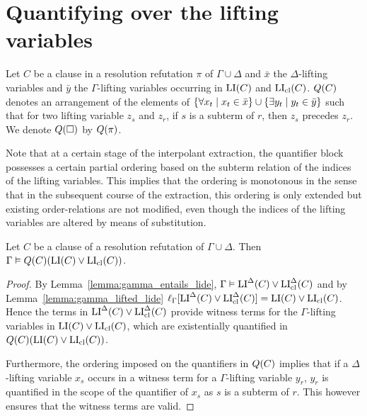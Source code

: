 \documentclass[,%
	draft=false,%
	numbers=noendperiod
	11pt,
	a4paper,
	oneside,%
	openany,
]{memoir}
\begin{document}
\section{Quantifying over the lifting variables}

\begin{defi}
	\label{old:def:arrow_quantifier_block}
	Let $C$ be a clause in a resolution refutation $\pi$ of $\Gamma\cup\Delta$
	and $\bar x$ the $\Delta$-lifting variables and $\bar y$ the $\Gamma$-lifting variables occurring in $\operatorname{LI}(C)$ and $\operatorname{LI}_{\operatorname{cl}}(C)$.
	$Q(C)$ denotes an arrangement of the elements of  $\{ \forall x_t \mid\nolinebreak x_t \in \bar x\} \cup \{ \exists y_t \mid y_t \in \bar y\}$ such that for two lifting variable $z_s$ and $z_r$, if $s$ is a subterm of $r$, then $z_s$ precedes $z_r$.
	We denote $Q(\square)$ by $Q(\pi)$.
\end{defi}

Note that at a certain stage of the interpolant extraction, the quantifier block possesses a certain partial ordering based on the subterm relation of the indices of the lifting variables.
This implies that the ordering is monotonous in the sense that in the subsequent course of the extraction, this ordering is only extended but existing order-relations are not modified, even though the indices of the lifting variables are altered by means of substitution.


\begin{lemma}
	\label{old:lemma:gamma_entails_quantified_lide}
	Let $C$ be a clause of a resolution refutation of $\Gamma\cup\Delta$. Then
	$\Gamma\vDash Q(C)(\operatorname{LI}(C) \lor \operatorname{LI}_{\operatorname{cl}}(C))$.
\end{lemma}
\begin{proof}
	By Lemma~\ref{lemma:gamma_entails_lide},
	$\Gamma\vDash \operatorname{LI}^\Delta(C) \lor \operatorname{LI}_{\operatorname{cl}}^\Delta(C)$ and 
	by Lemma~\ref{lemma:gamma_lifted_lide}
	$\ell_{\Gamma}[ \operatorname{LI}^\Delta(C) \lor \operatorname{LI}_{\operatorname{cl}}^\Delta(C)] = \operatorname{LI}(C) \lor \operatorname{LI}_{\operatorname{cl}}(C)$.
	Hence the terms in $\operatorname{LI}^\Delta(C) \lor \operatorname{LI}_{\operatorname{cl}}^\Delta(C)$ provide witness terms for the $\Gamma$-lifting variables in $\operatorname{LI}(C) \lor \operatorname{LI}_{\operatorname{cl}}(C)$, which are existentially quantified in $Q(C) (\operatorname{LI}(C) \lor \operatorname{LI}_{\operatorname{cl}}(C))$.

	Furthermore, the ordering imposed on the quantifiers in $Q(C)$ implies that if a $\Delta$-lifting variable $x_s$ occurs in a witness term for a $\Gamma$-lifting variable $y_r$, $y_r$ is quantified in the scope of the quantifier of $x_s$ as $s$ is a subterm of $r$.
	This however ensures that the witness terms are valid.
\end{proof}
\end{document}
